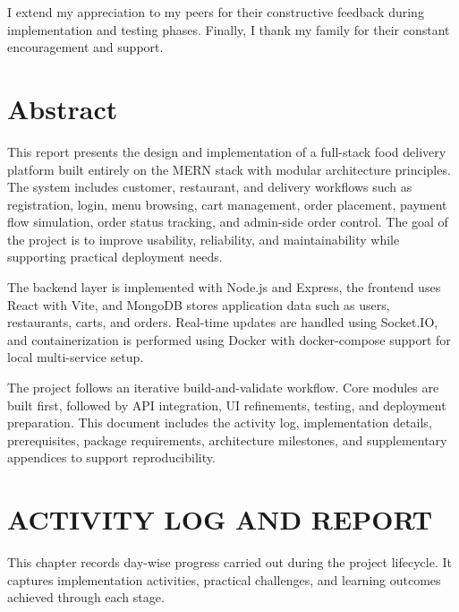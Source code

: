 \documentclass[12pt,a4paper]{report}
\begin{document}
I extend my appreciation to my peers for their constructive feedback during implementation and testing phases. Finally, I thank my family for their constant encouragement and support.

\clearpage

\chapter*{Abstract}
This report presents the design and implementation of a full-stack food delivery platform built entirely on the MERN stack with modular architecture principles. The system includes customer, restaurant, and delivery workflows such as registration, login, menu browsing, cart management, order placement, payment flow simulation, order status tracking, and admin-side order control. The goal of the project is to improve usability, reliability, and maintainability while supporting practical deployment needs.

The backend layer is implemented with Node.js and Express, the frontend uses React with Vite, and MongoDB stores application data such as users, restaurants, carts, and orders. Real-time updates are handled using Socket.IO, and containerization is performed using Docker with docker-compose support for local multi-service setup.

The project follows an iterative build-and-validate workflow. Core modules are built first, followed by API integration, UI refinements, testing, and deployment preparation. This document includes the activity log, implementation details, prerequisites, package requirements, architecture milestones, and supplementary appendices to support reproducibility.

\tableofcontents
\clearpage


\chapter{ACTIVITY LOG AND REPORT}
This chapter records day-wise progress carried out during the project lifecycle. It captures implementation activities, practical challenges, and learning outcomes achieved through each stage.
\end{document}
